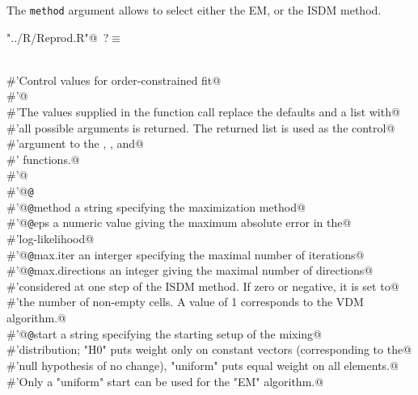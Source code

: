 \documentclass[reqno]{amsart}
\renewcommand{\NWtarget}[2]{\hypertarget{#1}{#2}}
\begin{document}
The \texttt{method} argument allows to select either the EM, or the ISDM method.
\begin{flushleft} \small\label{scrap10}\raggedright\small
\NWtarget{nuweb?}{} \verb@"../R/Reprod.R"@\nobreak\ {\footnotesize {?}}$\equiv$
\vspace{-1ex}
\begin{list}{}{} \item
\mbox{}\verb@@\\
\mbox{}\verb@#'Control values for order-constrained fit@\\
\mbox{}\verb@#'@\\
\mbox{}\verb@#'The values supplied in the function call replace the defaults and a list with@\\
\mbox{}\verb@#'all possible arguments is returned.  The returned list is used as the control@\\
\mbox{}\verb@#'argument to the , , and@\\
\mbox{}\verb@#' functions.@\\
\mbox{}\verb@#'@\\
\mbox{}\verb@#'@{\tt @}\verb@export@\\
\mbox{}\verb@#'@{\tt @}\verb@param method a string specifying the maximization method@\\
\mbox{}\verb@#'@{\tt @}\verb@param eps a numeric value giving the maximum absolute error in the@\\
\mbox{}\verb@#'log-likelihood@\\
\mbox{}\verb@#'@{\tt @}\verb@param max.iter an interger specifying the maximal number of iterations@\\
\mbox{}\verb@#'@{\tt @}\verb@param max.directions an integer giving the maximal number of directions@\\
\mbox{}\verb@#'considered at one step of the ISDM method.  If zero or negative, it is set to@\\
\mbox{}\verb@#'the number of non-empty cells. A value of 1 corresponds to the VDM algorithm.@\\
\mbox{}\verb@#'@{\tt @}\verb@param start a string specifying the starting setup of the mixing@\\
\mbox{}\verb@#'distribution; "H0" puts weight only on constant vectors (corresponding to the@\\
\mbox{}\verb@#'null hypothesis of no change), "uniform" puts equal weight on all elements.@\\
\mbox{}\verb@#'Only a "uniform" start can be used for the "EM" algorithm.@\\

\end{list}
\end{flushleft}
\end{document}
